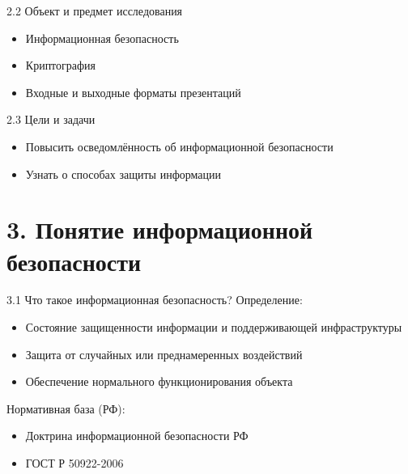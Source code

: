 \documentclass[
  ignorenonframetext,
  aspectratio=169,
  russian,
]{beamer}
\providecommand{\tightlist}{%
  \setlength{\itemsep}{0pt}\setlength{\parskip}{0pt}}
\begin{document}
\begin{frame}{2.2 Объект и предмет исследования}
\label{ux43eux431ux44aux435ux43aux442-ux438-ux43fux440ux435ux434ux43cux435ux442-ux438ux441ux441ux43bux435ux434ux43eux432ux430ux43dux438ux44f}
\begin{itemize}[<+->]
\tightlist
\item
  Информационная безопасность
\item
  Криптография
\item
  Входные и выходные форматы презентаций
\end{itemize}
\end{frame}

\begin{frame}{2.3 Цели и задачи}
\label{ux446ux435ux43bux438-ux438-ux437ux430ux434ux430ux447ux438}
\begin{itemize}[<+->]
\tightlist
\item
  Повысить осведомлённость об информационной безопасности
\item
  Узнать о способах защиты информации
\end{itemize}
\end{frame}

\section{3. Понятие информационной
безопасности}\label{ux43fux43eux43dux44fux442ux438ux435-ux438ux43dux444ux43eux440ux43cux430ux446ux438ux43eux43dux43dux43eux439-ux431ux435ux437ux43eux43fux430ux441ux43dux43eux441ux442ux438}

\begin{frame}{3.1 Что такое информационная безопасность?}
\label{ux447ux442ux43e-ux442ux430ux43aux43eux435-ux438ux43dux444ux43eux440ux43cux430ux446ux438ux43eux43dux43dux430ux44f-ux431ux435ux437ux43eux43fux430ux441ux43dux43eux441ux442ux44c}
Определение:

\begin{itemize}[<+->]
\tightlist
\item
  Состояние защищенности информации и поддерживающей инфраструктуры
\item
  Защита от случайных или преднамеренных воздействий
\item
  Обеспечение нормального функционирования объекта
\end{itemize}

Нормативная база (РФ):

\begin{itemize}[<+->]
\tightlist
\item
  Доктрина информационной безопасности РФ
\item
  ГОСТ Р 50922-2006
\end{itemize}
\end{frame}
\end{document}
